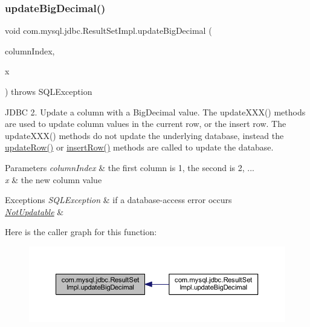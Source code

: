 \subsubsection{\texorpdfstring{update\+Big\+Decimal()}{updateBigDecimal()}\hspace{0.1cm}{\footnotesize\ttfamily [1/2]}}
{\footnotesize\ttfamily void com.\+mysql.\+jdbc.\+Result\+Set\+Impl.\+update\+Big\+Decimal (\begin{DoxyParamCaption}\item[{int}]{column\+Index,  }\item[{Big\+Decimal}]{x }\end{DoxyParamCaption}) throws S\+Q\+L\+Exception}

J\+D\+BC 2. Update a column with a Big\+Decimal value. The update\+X\+X\+X() methods are used to update column values in the current row, or the insert row. The update\+X\+X\+X() methods do not update the underlying database, instead the \mbox{\hyperlink{classcom_1_1mysql_1_1jdbc_1_1_result_set_impl_a2842d32292d023aaeeafedeed3322981}{update\+Row()}} or \mbox{\hyperlink{classcom_1_1mysql_1_1jdbc_1_1_result_set_impl_a78e304e3279cbcf60392f18c1385e3bf}{insert\+Row()}} methods are called to update the database.


\begin{DoxyParams}{Parameters}
{\em column\+Index} & the first column is 1, the second is 2, ... \\
\hline
{\em x} & the new column value\\
\hline
\end{DoxyParams}

\begin{DoxyExceptions}{Exceptions}
{\em S\+Q\+L\+Exception} & if a database-\/access error occurs \\
\hline
{\em \mbox{\hyperlink{classcom_1_1mysql_1_1jdbc_1_1_not_updatable}{Not\+Updatable}}} & \\
\hline
\end{DoxyExceptions}
Here is the caller graph for this function\+:
\nopagebreak
\begin{figure}[H]
\begin{center}
\leavevmode
\includegraphics[width=350pt]{classcom_1_1mysql_1_1jdbc_1_1_result_set_impl_a36e44642a8dd4749f1ee694183c4b07f_icgraph}
\end{center}
\end{figure}
\mbox{\label{classcom_1_1mysql_1_1jdbc_1_1_result_set_impl_aa70d9b9fa31249d079cd0c75eab4eacf}} 
